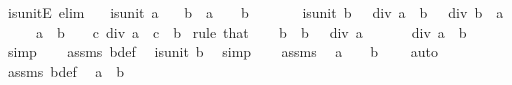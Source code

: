 \begin{isabellebody}
%
\endisadelimproof
\isanewline
{}\isamarkupfalse%
\ is{\isacharunderscore}{\kern0pt}unitE\ {\isacharbrackleft}{\kern0pt}elim{\isacharquery}{\kern0pt}{\isacharbrackright}{\kern0pt}{\isacharcolon}{\kern0pt}\isanewline
\ \ \ {\isachardoublequoteopen}is{\isacharunderscore}{\kern0pt}unit\ a{\isachardoublequoteclose}\isanewline
\ \ \ b\ \ {\isachardoublequoteopen}a\ {\isasymnoteq}\ {}{\isachardoublequoteclose}\ \ {\isachardoublequoteopen}b\ {\isasymnoteq}\ {}{\isachardoublequoteclose}\isanewline
\ \ \ \ \ {\isachardoublequoteopen}is{\isacharunderscore}{\kern0pt}unit\ b{\isachardoublequoteclose}\ \ {\isachardoublequoteopen}{}\ div\ a\ {\isacharequal}{\kern0pt}\ b{\isachardoublequoteclose}\ \ {\isachardoublequoteopen}{}\ div\ b\ {\isacharequal}{\kern0pt}\ a{\isachardoublequoteclose}\isanewline
\ \ \ \ \ {\isachardoublequoteopen}a\ {\isacharasterisk}{\kern0pt}\ b\ {\isacharequal}{\kern0pt}\ {}{\isachardoublequoteclose}\ \ {\isachardoublequoteopen}c\ div\ a\ {\isacharequal}{\kern0pt}\ c\ {\isacharasterisk}{\kern0pt}\ b{\isachardoublequoteclose}\isanewline
%
\isadelimproof
%
\endisadelimproof
%
\isatagproof
{}\isamarkupfalse%
\ {\isacharparenleft}{\kern0pt}rule\ that{\isacharparenright}{\kern0pt}\isanewline
\ \ \isamarkupfalse%
\ b\ \ {\isachardoublequoteopen}b\ {\isacharequal}{\kern0pt}\ {}\ div\ a{\isachardoublequoteclose}\isanewline
\ \ \isamarkupfalse%
\ \isamarkupfalse%
\ {\isachardoublequoteopen}{}\ div\ a\ {\isacharequal}{\kern0pt}\ b{\isachardoublequoteclose}\ \isamarkupfalse%
\ simp\isanewline
\ \ \isamarkupfalse%
\ assms\ b{\isacharunderscore}{\kern0pt}def\ \isamarkupfalse%
\ {\isachardoublequoteopen}is{\isacharunderscore}{\kern0pt}unit\ b{\isachardoublequoteclose}\ \isamarkupfalse%
\ simp\isanewline
\ \ \isamarkupfalse%
\ assms\ \isamarkupfalse%
\ {\isachardoublequoteopen}a\ {\isasymnoteq}\ {}{\isachardoublequoteclose}\ \ {\isachardoublequoteopen}b\ {\isasymnoteq}\ {}{\isachardoublequoteclose}\ \isamarkupfalse%
\ auto\isanewline
\ \ \isamarkupfalse%
\ assms\ b{\isacharunderscore}{\kern0pt}def\ \isamarkupfalse%
\ {\isachardoublequoteopen}a\ {\isacharasterisk}{\kern0pt}\ b\ {\isacharequal}{\kern0pt}\ {}{\isachardoublequoteclose}\ \isamarkupfalse%

\end{isabellebody}
